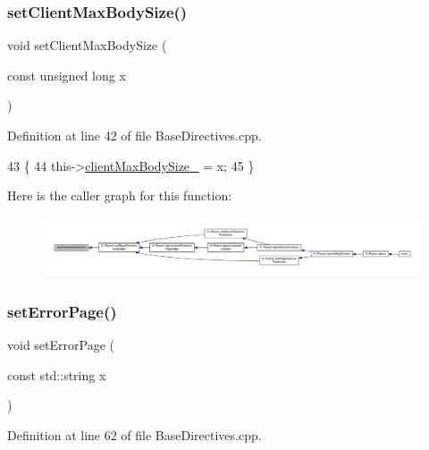 \subsubsection{\texorpdfstring{set\+Client\+Max\+Body\+Size()}{setClientMaxBodySize()}}
{\footnotesize\ttfamily void set\+Client\+Max\+Body\+Size (\begin{DoxyParamCaption}\item[{const unsigned long}]{x }\end{DoxyParamCaption})}



Definition at line 42 of file Base\+Directives.\+cpp.


\begin{DoxyCode}
43     \{
44         this->\hyperlink{classft_1_1_base_directives_ad65c2594d2a90ca065d410dfd4066a19}{clientMaxBodySize\_} = x;
45     \}
\end{DoxyCode}
Here is the caller graph for this function\+:
\nopagebreak
\begin{figure}[H]
\begin{center}
\leavevmode
\includegraphics[width=350pt]{classft_1_1_base_directives_a39bf4922f3236043c76beaffaa557a3b_icgraph}
\end{center}
\end{figure}
\mbox{\label{classft_1_1_base_directives_a505ecc88b3e1779583ad60cc243c7769}} 
\subsubsection{\texorpdfstring{set\+Error\+Page()}{setErrorPage()}}
{\footnotesize\ttfamily void set\+Error\+Page (\begin{DoxyParamCaption}\item[{const std\+::string}]{x }\end{DoxyParamCaption})}



Definition at line 62 of file Base\+Directives.\+cpp.


